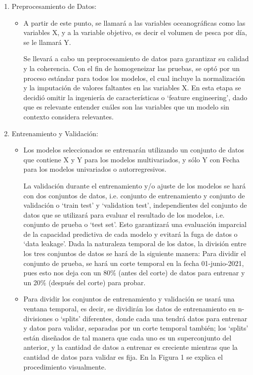 \begin{enumerate}
\begin{table}[htbp]
\begin{tabular}{|p{4cm}|p{7.5cm}|}
    \hline
  \end{tabular}
\end{table}
\newpage
\item Preprocesamiento de Datos:

\begin{itemize}
    \item A partir de este punto, se llamará a las variables oceanográficas como las variables X, y a la variable objetivo, es decir el volumen de pesca por día, se le llamará Y. 
    
    Se llevará a cabo un preprocesamiento de datos para garantizar su calidad y la coherencia. Con el fin de homogeneizar las pruebas, se optó por un proceso estándar para todos los modelos, el cual incluye la normalización y la imputación de valores faltantes en las variables X. En esta etapa se decidió omitir la ingeniería de características o ‘feature engineering’, dado que es relevante entender cuáles son las variables que un modelo sin contexto considera relevantes.

\end{itemize}

\item Entrenamiento y Validación:
\itemsep=0pt\topsep=0pt\partopsep=0pt
\parskip=0pt\parsep=0pt
\begin{itemize}
    \item Los modelos seleccionados se entrenarán utilizando un conjunto de datos que contiene X y Y para los modelos multivariados, y sólo Y con Fecha para los modelos univariados o autorregresivos.

    La validación durante el entrenamiento y/o ajuste de los modelos se hará con dos conjuntos de datos, i.e. conjunto de entrenamiento y conjunto de validación o ‘train test’ y ‘validation test’, independientes del conjunto de datos que se utilizará para evaluar el resultado de los modelos, i.e. conjunto de prueba o ‘test set’. Esto garantizará una evaluación imparcial de la capacidad predictiva de cada modelo y evitará la fuga de datos o ‘data leakage’.
    Dada la naturaleza temporal de los datos, la división entre los tres conjuntos de datos se hará de la siguiente manera: Para dividir el conjunto de prueba, se hará un corte temporal en la fecha 01-junio-2021, pues esto nos deja con un 80\% (antes del corte) de datos para entrenar y un 20\% (después del corte) para probar. 

    \item Para dividir los conjuntos de entrenamiento y validación se usará una ventana temporal, es decir, se dividirán los datos de entrenamiento en n-divisiones o ‘splits’ diferentes, donde cada una tendrá datos para entrenar y datos para validar, separadas por un corte temporal también; los ‘splits’ están diseñados de tal manera que cada uno es un superconjunto del anterior, y la cantidad de datos a entrenar es creciente mientras que la cantidad de datos para validar es fija. En la Figura 1 se explica el procedimiento visualmente.
    

\end{itemize}
\end{enumerate}

